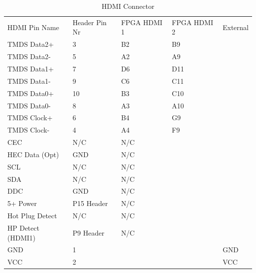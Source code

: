 \begin{table}[]
    \centering
    \caption{HDMI Connector}
    \label{HDMI Connector}
    \begin{tabular}{lllll}

        HDMI Pin Name            & Header Pin Nr & FPGA HDMI 1 & FPGA HDMI 2 & External \\
        TMDS Data2+              & 3             & B2              & B9              &          \\
        TMDS Data2-              & 5             & A2              & A9              &          \\
        TMDS Data1+              & 7             & D6              & D11             &          \\
        TMDS Data1-              & 9             & C6              & C11             &          \\
        TMDS Data0+              & 10            & B3              & C10             &          \\
        TMDS Data0-              & 8             & A3              & A10             &          \\
        TMDS Clock+              & 6             & B4              & G9              &          \\
        TMDS Clock-              & 4             & A4              & F9              &          \\
        CEC                      & N/C           & N/C             &                 &          \\
        HEC Data (Opt)           & GND           & N/C             &                 &          \\
        SCL                      & N/C           & N/C             &                 &          \\
        SDA                      & N/C           & N/C             &                 &          \\
        DDC                      & GND           & N/C             &                 &          \\
        5+ Power                 & P15 Header    & N/C             &                 &          \\
        Hot Plug Detect          & N/C           & N/C             &                 &          \\
        HP Detect (HDMI1) & P9 Header     & N/C             &                 &          \\
        GND & 1             &                 &                 & GND      \\
        VCC & 2             &                 &                 & VCC      \\
    \end{tabular}
\end{table}

